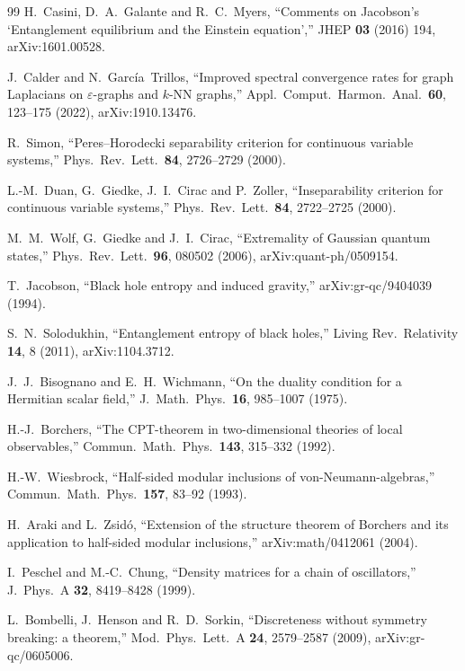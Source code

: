 \documentclass[11pt,a4paper]{article}
\theoremstyle{stmt}
\theoremstyle{defn}
\theoremstyle{rmk}
\numberwithin{equation}{section}
\begin{document}
{\begin{thebibliography}{99}
 H.~Casini, D.~A.~Galante and R.~C.~Myers, ``Comments on Jacobson's `Entanglement equilibrium and the Einstein equation','' JHEP \textbf{03} (2016) 194, arXiv:1601.00528.

 J.~Calder and N.~Garc\'ia~Trillos, ``Improved spectral convergence rates for graph Laplacians on $\varepsilon$-graphs and $k$-NN graphs,'' Appl.\ Comput.\ Harmon.\ Anal.\ \textbf{60}, 123--175 (2022), arXiv:1910.13476.

 R.~Simon, ``Peres--Horodecki separability criterion for continuous variable systems,'' Phys.\ Rev.\ Lett.\ \textbf{84}, 2726--2729 (2000).

 L.-M.~Duan, G.~Giedke, J.~I.~Cirac and P.~Zoller, ``Inseparability criterion for continuous variable systems,'' Phys.\ Rev.\ Lett.\ \textbf{84}, 2722--2725 (2000).

 M.~M.~Wolf, G.~Giedke and J.~I.~Cirac, ``Extremality of Gaussian quantum states,'' Phys.\ Rev.\ Lett.\ \textbf{96}, 080502 (2006), arXiv:quant-ph/0509154.

 T.~Jacobson, ``Black hole entropy and induced gravity,'' arXiv:gr-qc/9404039 (1994).

 S.~N.~Solodukhin, ``Entanglement entropy of black holes,'' Living Rev.\ Relativity \textbf{14}, 8 (2011), arXiv:1104.3712.

 J.~J.~Bisognano and E.~H.~Wichmann, ``On the duality condition for a Hermitian scalar field,'' J.\ Math.\ Phys.\ \textbf{16}, 985--1007 (1975).

 H.-J.~Borchers, ``The CPT-theorem in two-dimensional theories of local observables,'' Commun.\ Math.\ Phys.\ \textbf{143}, 315--332 (1992).

 H.-W.~Wiesbrock, ``Half-sided modular inclusions of von-Neumann-algebras,'' Commun.\ Math.\ Phys.\ \textbf{157}, 83--92 (1993).

 H.~Araki and L.~Zsid\'o, ``Extension of the structure theorem of Borchers and its application to half-sided modular inclusions,'' arXiv:math/0412061 (2004).

 I.~Peschel and M.-C.~Chung, ``Density matrices for a chain of oscillators,'' J.\ Phys.\ A \textbf{32}, 8419--8428 (1999).

 L.~Bombelli, J.~Henson and R.~D.~Sorkin, ``Discreteness without symmetry breaking: a theorem,'' Mod.\ Phys.\ Lett.\ A \textbf{24}, 2579--2587 (2009), arXiv:gr-qc/0605006.


\end{thebibliography}}
\end{document}
